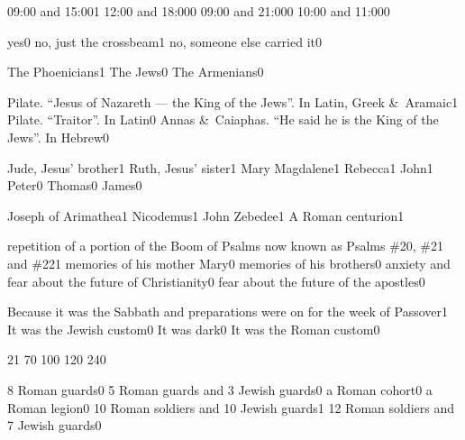 {09:00 and 15:00}{1}
{12:00 and 18:00}{0}
{09:00 and 21:00}{0}
{10:00 and 11:00}{0}
\qstop

{yes}{0}
{no, just the crossbeam}{1}
{no, someone else carried it}{0}
\qstop

{The Phoenicians}{1}
{The Jews}{0}
{The Armenians}{0}
\qstop

{Pilate. ``Jesus of Nazareth --- the King of the Jews''. In Latin, Greek \&\ Aramaic}{1}
{Pilate. ``Traitor''. In Latin}{0}
{Annas \&\ Caiaphas. ``He said he is the King of the Jews''. In Hebrew}{0}
\qstop

{Jude, Jesus' brother}{1}
{Ruth, Jesus' sister}{1}
{Mary Magdalene}{1}
{Rebecca}{1}
{John}{1}
{Peter}{0}
{Thomas}{0}
{James}{0}
\qstop

{Joseph of Arimathea}{1}
{Nicodemus}{1}
{John Zebedee}{1}
{A Roman centurion}{1}
\qstop

{repetition of a portion of the Boom of Psalms now known as Psalms \#20, \#21 and \#22}{1}
{memories of his mother Mary}{0}
{memories of his brothers}{0}
{anxiety and fear about the future of Christianity}{0}
{fear about the future of the apostles}{0}
\qstop


{Because it was the Sabbath and preparations were on for the week of Passover}{1}
{It was the Jewish custom}{0}
{It was dark}{0}
{It was the Roman custom}{0}
\qstop

{2}{1}
{7}{0}
{10}{0}
{12}{0}
{24}{0}
\qstop

{8 Roman guards}{0}
{5 Roman guards and 3 Jewish guards}{0}
{a Roman cohort}{0}
{a Roman legion}{0}
{10 Roman soldiers and 10 Jewish guards}{1}
{12 Roman soldiers and 7 Jewish guards}{0}
\qstop


